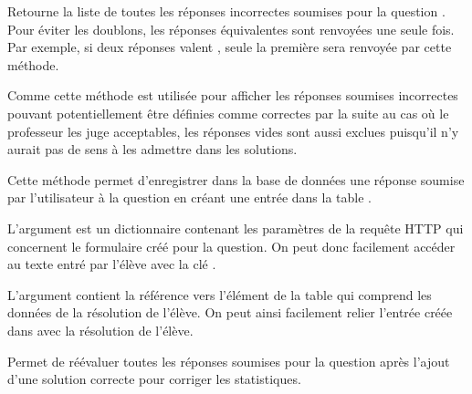 \documentclass[a4,10pt,french]{sphinxmanual}
\begin{document}
\begin{fulllineitems}
\begin{fulllineitems}
\end{fulllineitems}


\begin{fulllineitems}
\label{database:quiz.models.SimpleQuestion.get_wrong_answers}
Retourne la liste de toutes les réponses incorrectes soumises pour la question .
Pour éviter les doublons, les réponses équivalentes sont renvoyées une seule fois.
Par exemple, si deux réponses valent , seule la première sera renvoyée par
cette méthode.

Comme cette méthode est utilisée pour afficher les réponses soumises incorrectes pouvant
potentiellement être définies comme correctes par la suite au cas où le 
professeur les juge acceptables, les réponses vides sont aussi exclues 
puisqu'il n'y aurait pas de sens à les admettre dans les solutions.

\end{fulllineitems}


\begin{fulllineitems}
\label{database:quiz.models.SimpleQuestion.save_submit}
Cette méthode permet d'enregistrer dans la base de données une réponse soumise
par l'utilisateur à la question  en créant une entrée dans la table
.

L'argument  est un dictionnaire contenant les paramètres de la 
requête HTTP qui concernent le formulaire créé pour la question. On peut donc
facilement accéder au texte entré par l'élève avec la clé .

L'argument  contient la référence vers l'élément de la table
 qui comprend les données de la résolution de l'élève. On
peut ainsi facilement relier l'entrée créée dans  avec la résolution
de l'élève.

\end{fulllineitems}


\begin{fulllineitems}
\label{database:quiz.models.SimpleQuestion.update_question_results}
Permet de réévaluer toutes les réponses soumises pour la question après
l'ajout d'une solution correcte pour corriger les statistiques.


\end{fulllineitems}
\end{fulllineitems}
\end{document}
